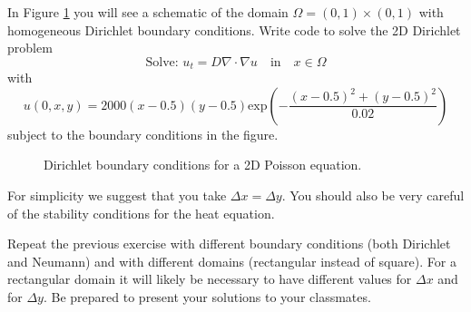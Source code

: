 \begin{problem}
    In Figure \ref{fig:2DHeat_BC} you will see a schematic of the domain
    $\Omega=(0,1)\times (0,1)$ with homogeneous Dirichlet boundary conditions.  Write code
    to solve the 2D Dirichlet problem
    \[ \text{Solve: } u_t = D \nabla \cdot \nabla u  \quad \text{in} \quad x \in
    \Omega \]
    with
    \[ u(0,x,y) = 2000 (x-0.5)(y-0.5)\text{exp}\left( -\frac{(x-0.5)^2 + (y-0.5)^2}{0.02} \right) \]
    subject to the boundary conditions in the figure.

    \begin{figure}[ht!]
        \centering
        \caption{Dirichlet boundary conditions for a 2D Poisson equation.}
        \label{fig:2DHeat_BC}
    \end{figure}
    For simplicity we suggest that you take $\Delta x = \Delta y$.  You should also be
    very careful of the stability conditions for the heat equation.  
\end{problem}

\begin{problem}
    Repeat the previous exercise with different boundary conditions (both Dirichlet and
    Neumann) and with different domains (rectangular instead of square).  For a
    rectangular domain it will likely be necessary to have different values for $\Delta
    x$ and for $\Delta y$. Be prepared to present your solutions to your classmates.
\end{problem}

